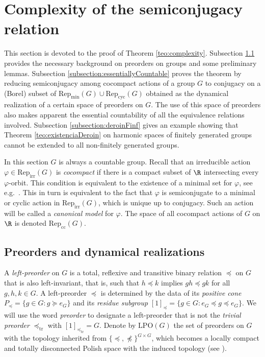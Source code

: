 \documentclass[reqno]{amsart}
\begin{document}
\section{Complexity of the semiconjugacy relation} \label{section:complexity}
This section is devoted to the proof of Theorem \ref{teo:complexity}. Subsection \ref{subsection:semiconjugacy} provides the necessary background on preorders on groups and some preliminary lemmas. Subsection \ref{subsection:essentiallyCountable} proves the theorem by reducing semiconjugacy among cocompact actions of a group $G$ to conjugacy on a (Borel) subset of $\mathrm{Rep}_\mathrm{min}(G) \cup \mathrm{Rep}_\mathrm{cyc}(G)$ obtained as the dynamical realization of a certain space of preorders on $G$. The use of this space of preorders also makes apparent the essential countability of all the equivalence relations involved. Subsection \ref{subsection:deroinFinf} gives an example showing that Theorem \ref{teo:existenciaDeroin} on harmonic spaces of finitely generated groups cannot be extended to all non-finitely generated groups.

In this section $G$ is always a countable group. Recall that an irreducible action $\varphi \in \mathrm{Rep}_\mathrm{irr}(G)$ is \emph{cocompact} if there is a compact subset of $\R$ intersecting every $\varphi$-orbit. This condition is equivalent to the existence of a minimal set for $\varphi$, see e.g.~\cite[Lemma 2.1.11]{BMRT}. This in turn is equivalent to the fact that $\varphi$ is semiconjugate to a  minimal or cyclic action in $\mathrm{Rep}_\mathrm{irr}(G)$,  which is unique up to conjugacy. Such an action will be called a \emph{canonical model} for $\varphi$. The space of all cocompact actions of $G$ on $\R$ is denoted $\mathrm{Rep}_\mathrm{cc}(G)$. 

\subsection{Preorders and dynamical realizations} \label{subsection:semiconjugacy}
A \emph{left-preorder} on $G$ is a total, reflexive and transitive binary relation $\preceq$ on $G$ that is also left-invariant, that is, such that $h \preceq k$ implies $gh \preceq gk$ for all $g,h,k \in G$. A left-preorder $\preceq$ is determined by the data of its \emph{positive cone} $P_\preceq = \{g \in G : g \succeq e_G\}$ and its \emph{residue subgroup} $[1]_\preceq = \{g \in G : e_G \preceq g \preceq e_G\}$. We will use the word \emph{preorder} to designate a left-preorder that is not the \emph{trivial preorder} $\preceq_\mathrm{tr}$ with $[1]_{\preceq_\mathrm{tr}} = G$. Denote by $\mathrm{LPO}(G)$ the set of preorders on $G$ with the topology inherited from $\{\preceq, \npreceq\}^{G \times G}$, which becomes a locally compact and totally disconnected Polish space with the induced topology (see \cite[Theorem 2.30]{DecaupRond2019}).
\end{document}
